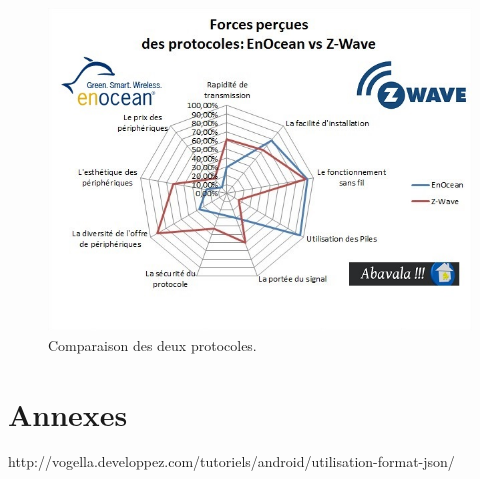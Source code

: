 \documentclass[a4paper,10pt]{article}
\begin{document}
\begin{figure}[H]
\centering\includegraphics[scale=0.7]{images/forces-enocean-vs-z-wave.jpg}
\caption{Comparaison des deux protocoles.}
\end{figure}

\section{Annexes}
http://vogella.developpez.com/tutoriels/android/utilisation-format-json/

 
\end{document}

